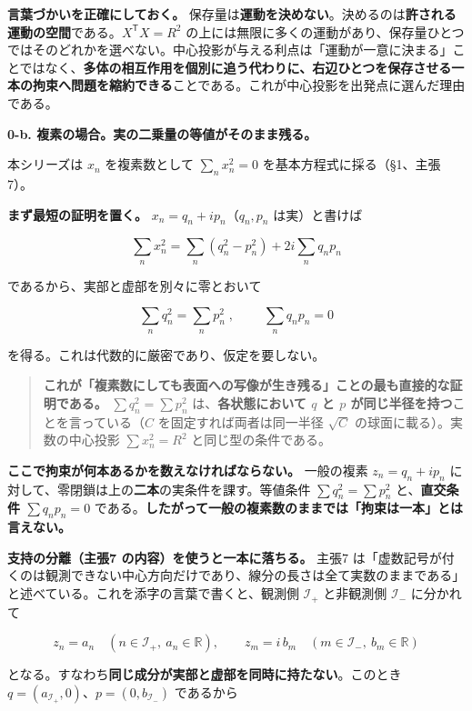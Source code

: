 \documentclass[
  10pt,
]{ltjsarticle}
\begin{document}
\textbf{言葉づかいを正確にしておく。}
保存量は\textbf{運動を決めない}。決めるのは\textbf{許される運動の空間}である。\(X^{\mathsf T}X = R^2\)
の上には無限に多くの運動があり、保存量ひとつではそのどれかを選べない。中心投影が与える利点は「運動が一意に決まる」ことではなく、\textbf{多体の相互作用を個別に追う代わりに、右辺ひとつを保存させる一本の拘束へ問題を縮約できる}ことである。これが中心投影を出発点に選んだ理由である。

\textbf{0-b. 複素の場合。実の二乗量の等値がそのまま残る。}

本シリーズは \(x_n\) を複素数として \(\sum_n x_n^2 = 0\)
を基本方程式に採る（§1、主張7）。

\textbf{まず最短の証明を置く。} \(x_n = q_n + ip_n\)（\(q_n, p_n\)
は実）と書けば

\[\sum_n x_n^2 = \sum_n (q_n^2 - p_n^2) + 2i\sum_n q_np_n\]

であるから、実部と虚部を別々に零とおいて

\[\boxed{\;\sum_n q_n^2 = \sum_n p_n^2\;}, \qquad \boxed{\;\sum_n q_np_n = 0\;}\]

を得る。これは代数的に厳密であり、仮定を要しない。

\begin{quote}
\textbf{これが「複素数にしても表面への写像が生き残る」ことの最も直接的な証明である。}
\(\sum q_n^2 = \sum p_n^2\) は、\textbf{各状態において \(q\) と \(p\)
が同じ半径を持つ}ことを言っている（\(C\) を固定すれば両者は同一半径
\(\sqrt{C}\) の球面に載る）。実数の中心投影 \(\sum x_n^2 = R^2\)
と同じ型の条件である。
\end{quote}

\textbf{ここで拘束が何本あるかを数えなければならない。} 一般の複素
\(z_n = q_n + ip_n\)
に対して、零閉鎖は上の\textbf{二本}の実条件を課す。等値条件
\(\sum q_n^2 = \sum p_n^2\) と、\textbf{直交条件 \(\sum q_np_n = 0\)}
である。\textbf{したがって一般の複素数のままでは「拘束は一本」とは言えない。}

\textbf{支持の分離（主張7 の内容）を使うと一本に落ちる。} 主張7
は「虚数記号が付くのは観測できない中心方向だけであり、線分の長さは全て実数のままである」と述べている。これを添字の言葉で書くと、観測側
\(\mathcal{I}_+\) と非観測側 \(\mathcal{I}_-\) に分かれて

\[z_n = a_n \quad (n \in \mathcal{I}_+, \ a_n \in \mathbb{R}), \qquad z_m = i\,b_m \quad (m \in \mathcal{I}_-, \ b_m \in \mathbb{R})\]

となる。すなわち\textbf{同じ成分が実部と虚部を同時に持たない}。このとき
\(q = (a_{\mathcal{I}_+}, 0)\)、\(p = (0, b_{\mathcal{I}_-})\)
であるから
\end{document}
